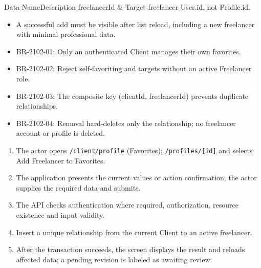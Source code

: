 
\begin{specdatatable}{Data Name}{Description}
freelancerId & Target freelancer User.id, not Profile.id.\\ \hline
\end{specdatatable}

\begin{itemize}[leftmargin=1.6em,topsep=3pt,itemsep=2pt,parsep=0pt,label=$\bullet$]
    \item A successful add must be visible after list reload, including a new freelancer with minimal professional data.
\end{itemize}

\begin{itemize}[leftmargin=1.6em,topsep=3pt,itemsep=2pt,parsep=0pt,label=$\bullet$]\brrulelist
    \item BR-2102-01: Only an authenticated Client manages their own favorites.
    \item BR-2102-02: Reject self-favoriting and targets without an active Freelancer role.
    \item BR-2102-03: The composite key (clientId, freelancerId) prevents duplicate relationships.
    \item BR-2102-04: Removal hard-deletes only the relationship; no freelancer account or profile is deleted.
\end{itemize}

\begin{enumerate}[leftmargin=1.8em,topsep=3pt,itemsep=2pt,parsep=0pt]
    \item The actor opens \texttt{/\allowbreak{}client/\allowbreak{}profile} (Favorites); \texttt{/\allowbreak{}profiles/\allowbreak{}[id]} and selects Add Freelancer to Favorites.
    \item The application presents the current values or action confirmation; the actor supplies the required data and submits.
    \item The API checks authentication where required, authorization, resource existence and input validity.
    \item Insert a unique relationship from the current Client to an active freelancer.
    \item After the transaction succeeds, the screen displays the result and reloads affected data; a pending revision is labeled as awaiting review.
\end{enumerate}

